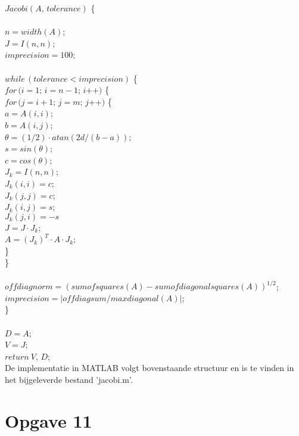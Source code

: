 \documentclass[a4paper]{article}
\newcommand{\opgave}[1]{\section*{Opgave #1}}
\newcommand\tab[1][1cm]{\hspace*{#1}}
\begin{document}
$Jacobi(A,\, tolerance)$ \{\\
\\
\tab $n = width(A)$;\\
\tab $J = I(n,n)$;\\
\tab $imprecision = 100$;\\
\\
\tab $while\, (tolerance < imprecision)$ \{\\
\tab \tab $for\, (i = 1;\, i = n-1;\, i$++$)$ \{\\
\tab \tab \tab $for\, (j = i+1;\, j = m;\, j$++$)$ \{\\
\tab \tab \tab \tab $a = A(i,i)$;\\
\tab \tab \tab \tab $b = A(i,j)$;\\
\tab \tab \tab \tab $\theta = (1/2) \cdot atan(2d/(b-a))$;\\
\tab \tab \tab \tab $s = sin(\theta)$;\\
\tab \tab \tab \tab $c = cos(\theta)$;\\
\tab \tab \tab \tab $J_k = I(n,n)$;\\
\tab \tab \tab \tab $J_k(i,i) = c$;\\
\tab \tab \tab \tab $J_k(j,j) = c$;\\
\tab \tab \tab \tab $J_k(i,j) = s$;\\
\tab \tab \tab \tab $J_k(j,i) = -s$\\
\tab \tab \tab \tab $J = J \cdot J_k$;\\
\tab \tab \tab \tab $A = (J_k)^T \cdot A \cdot J_k$;\\
\tab \tab \tab \}\\
\tab \tab \}\\
\tab \tab \\
\tab \tab $offdiagnorm = (sumofsquares(A) - sumofdiagonalsquares(A))^{1/2}$;\\
\tab \tab $imprecision = |offdiagsum/maxdiagonal(A)|$;\\
\tab \}\\
\tab \\
\tab $D = A$;\\
\tab $V = J$;\\
\tab $return\ V,\,D$;\\

De implementatie in MATLAB volgt bovenstaande structuur en is te vinden in het bijgeleverde bestand 'jacobi.m'.

\pagebreak

\opgave{11}
\end{document}
